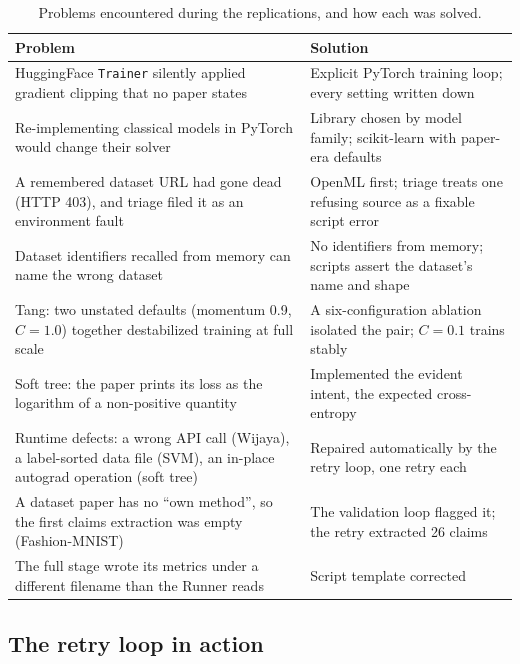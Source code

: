 \documentclass[10pt,twocolumn]{article}
\begin{document}
\begin{table}[tbp]
\centering
\small
\caption{Problems encountered during the replications, and how each was solved.}
\label{tab:problems}
\begin{tabular}{L{0.44\textwidth}L{0.48\textwidth}}
\toprule
Problem & Solution \\
\midrule
HuggingFace \texttt{Trainer} silently applied gradient clipping that no paper states
  & Explicit PyTorch training loop; every setting written down \\
Re-implementing classical models in PyTorch would change their solver
  & Library chosen by model family; scikit-learn with paper-era defaults \\
A remembered dataset URL had gone dead (HTTP 403), and triage filed it as an environment fault
  & OpenML first; triage treats one refusing source as a fixable script error \\
Dataset identifiers recalled from memory can name the wrong dataset
  & No identifiers from memory; scripts assert the dataset's name and shape \\
Tang: two unstated defaults (momentum 0.9, $C = 1.0$) together destabilized training at full
  scale & A six-configuration ablation isolated the pair; $C = 0.1$ trains stably \\
Soft tree: the paper prints its loss as the logarithm of a non-positive quantity
  & Implemented the evident intent, the expected cross-entropy \\
Runtime defects: a wrong API call (Wijaya), a label-sorted data file (SVM), an in-place
  autograd operation (soft tree) & Repaired automatically by the retry loop, one retry each \\
A dataset paper has no ``own method'', so the first claims extraction was empty (Fashion-MNIST)
  & The validation loop flagged it; the retry extracted 26 claims \\
The full stage wrote its metrics under a different filename than the Runner reads
  & Script template corrected \\
\bottomrule
\end{tabular}
\end{table}

\subsection{The retry loop in action}
\end{document}
